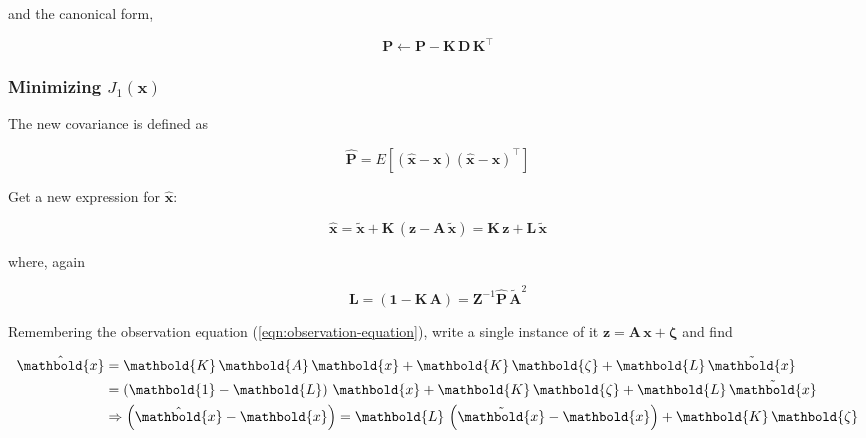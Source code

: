 \documentclass[10pt,oneside,x11names]{article}
\begin{document}
\noindent and the canonical form,

\begin{equation}
\label{eqn:p-is-p-minus-kdkt}
\mathbold{P}\leftarrow
\mathbold{P} -
\mathbold{K}\,
\mathbold{D}\,
\mathbold{K}^\intercal
\end{equation}

\subsubsection{Minimizing \(J_1({\mathbold{x}})\)}
\label{sec:orgheadline10}

The new covariance is defined as

\begin{equation}
{\hat{\mathbold{P}}} =
E
\left[
({\hat{\mathbold{x}}}-\mathbold{x})
({\hat{\mathbold{x}}}-\mathbold{x})^\intercal
\right]
\end{equation}

\noindent Get a new expression for \({\hat{\mathbold{x}}}\):

\begin{equation}
{\hat{\mathbold{x}}} =
{\tilde{\mathbold{x}}}+
\mathbold{K}\,
(\mathbold{z}-
\mathbold{A}\,
{\tilde{\mathbold{x}}}) =
\mathbold{K}\,
\mathbold{z} +
\mathbold{L}\,
{\tilde{\mathbold{x}}}
\end{equation}

\noindent where, again

\begin{equation}
\mathbold{L}
=
(\mathbold{1}-
\mathbold{K}\,
\mathbold{A})
=
\mathbold{Z}^{-1}
{\hat{\mathbold{P}}}\,
{\tilde{\mathbold{A}}}^2
\end{equation}

\noindent
Remembering the observation equation
(\ref{eqn:observation-equation}), write a single instance of it
\(\mathbold{z} =
\mathbold{A}\,
\mathbold{x}+
\mathbold{\zeta}\) and find

\begin{align}
\notag
{\hat{\mathbold{x}}}
&=
\mathbold{K}\,
\mathbold{A}\,
\mathbold{x} +
\mathbold{K}\,
\mathbold{\zeta} +
\mathbold{L}\,
{\tilde{\mathbold{x}}}
\\
\notag
&=
\left(
\mathbold{1}-
\mathbold{L}
\right)\,
\mathbold{x} +
\mathbold{K}\,
\mathbold{\zeta} +
\mathbold{L}\,
{\tilde{\mathbold{x}}}
\\
&\Rightarrow
\left(
{\hat{\mathbold{x}}}-
\mathbold{x}
\right)=
\mathbold{L}\,
\left(
{\tilde{\mathbold{x}}}-
\mathbold{x}
\right) +
\mathbold{K}\,
\mathbold{\zeta}
\end{align}
\end{document}

